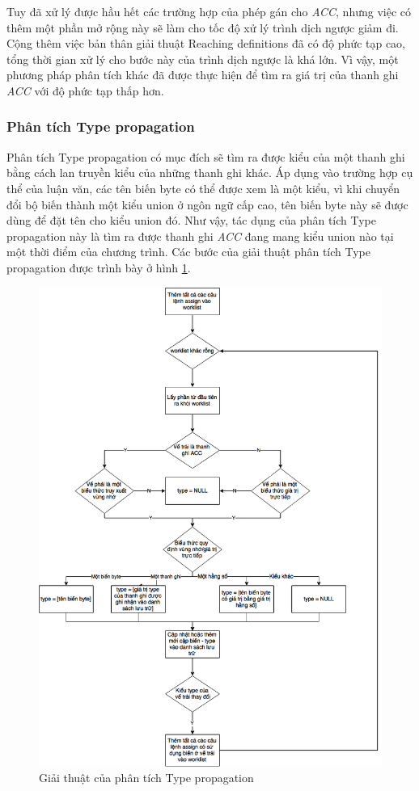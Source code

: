 Tuy đã xử lý được hầu hết các trường hợp của phép gán cho \textit{ACC}, nhưng việc có thêm một phần mở rộng này sẽ làm cho tốc độ xử lý trình dịch ngược giảm đi. Cộng thêm việc bản thân giải thuật Reaching definitions đã có độ phức tạp cao, tổng thời gian xử lý cho bước này của trình dịch ngược là khá lớn. Vì vậy, một phương pháp phân tích khác đã được thực hiện để tìm ra giá trị của thanh ghi \textit{ACC} với độ phức tạp thấp hơn.

\subsubsection{Phân tích Type propagation}
Phân tích Type propagation có mục đích sẽ tìm ra được kiểu của một thanh ghi bằng cách lan truyền kiểu của những thanh ghi khác. Áp dụng vào trường hợp cụ thể của luận văn, các tên biến byte có thể được xem là một kiểu, vì khi chuyển đổi bộ biến thành một kiểu union ở ngôn ngữ cấp cao, tên biến byte này sẽ được dùng để đặt tên cho kiểu union đó. Như vậy, tác dụng của phân tích Type propagation này là tìm ra được thanh ghi \textit{ACC} đang mang kiểu union nào tại một thời điểm của chương trình. Các bước của giải thuật phân tích Type propagation được trình bày ở hình \ref{fig:typepropagationalgo}.

\begin{figure}
	\centering
	\includegraphics[width=0.7\linewidth]{image/typePropagationAlgo}
	\caption{Giải thuật của phân tích Type propagation}
	\label{fig:typepropagationalgo}
\end{figure}

